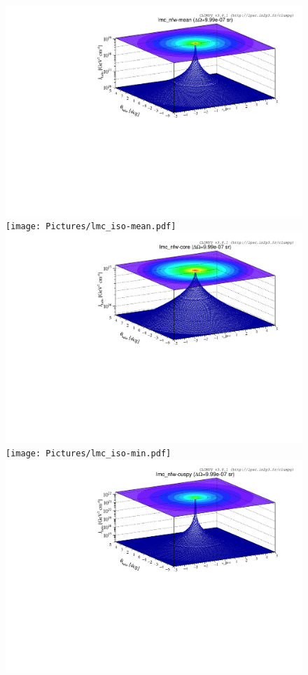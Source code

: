 \documentclass[main.tex]{subfiles}
\begin{document}
\begin{figure}[h]
\centering
{}
\includegraphics[width=1\textwidth]{Pictures/lmc_nfw-mean.pdf}
\endminipage 
{}
\texttt{[image: Pictures/lmc\_iso-mean.pdf]}
\endminipage \\
\includegraphics[width=1\textwidth]{Pictures/lmc_nfw-core.pdf}
\endminipage
{}
\texttt{[image: Pictures/lmc\_iso-min.pdf]}
\endminipage \\
\includegraphics[width=1\textwidth]{Pictures/lmc_nfw-cuspy.pdf}

\end{figure}
\end{document}

